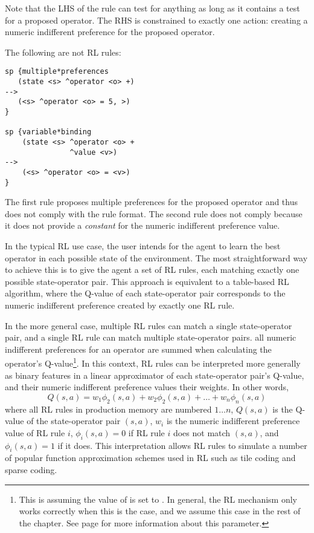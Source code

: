Note that the LHS of the rule can test for anything as long as it contains a test for a proposed operator.
The RHS is constrained to exactly one action: creating a numeric indifferent preference for the proposed operator.

The following are not RL rules:

\begin{verbatim}
sp {multiple*preferences
   (state <s> ^operator <o> +)
-->
   (<s> ^operator <o> = 5, >)
}

sp {variable*binding
    (state <s> ^operator <o> +
               ^value <v>)
-->
    (<s> ^operator <o> = <v>)
}
\end{verbatim}

The first rule proposes multiple preferences for the proposed operator and thus does not comply with the rule format.
The second rule does not comply because it does not provide a \emph{constant} for the numeric indifferent preference value.

In the typical RL use case, the user intends for the agent to learn the best operator in each possible state of the environment.
The most straightforward way to achieve this is to give the agent a set of RL rules, each matching exactly one possible state-operator pair.
This approach is equivalent to a table-based RL algorithm, where the Q-value of each state-operator pair corresponds to the numeric indifferent preference created by exactly one RL rule.

In the more general case, multiple RL rules can match a single state-operator pair, and a single RL rule can match multiple state-operator pairs.
all numeric indifferent preferences for an operator are summed when calculating the operator's Q-value\footnote{
This is assuming the value of  is set to .
In general, the RL mechanism only works correctly when this is the case, and we assume this case in the rest of the chapter.
See page \pageref{numeric-indifferent-mode} for more information about this parameter.}.
In this context, RL rules can be interpreted more generally as binary features in a linear approximator of each state-operator pair's Q-value, and their numeric indifferent preference values their weights.
In other words,
$$Q(s, a) = w_1 \phi_2 (s, a) + w_2 \phi_2 (s, a) + \ldots + w_n \phi_n (s, a)$$
where all RL rules in production memory are numbered $1 \dots n$, $Q(s, a)$ is the Q-value of the state-operator pair $(s, a)$, $w_i$ is the numeric indifferent preference value of RL rule $i$, $\phi_i (s, a) = 0$ if RL rule $i$ does not match $(s, a)$, and $\phi_i (s, a) = 1$ if it does.
This interpretation allows RL rules to simulate a number of popular function approximation schemes used in RL such as tile coding and sparse coding.

